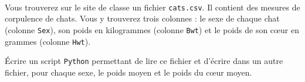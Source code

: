 \exer{[FIC-006]}
\setcounter{numques}{0}~\\

Vous trouverez sur le site de classe un fichier \texttt{cats.csv}.
Il contient des mesures de corpulence de chats. 
Vous y trouverez trois colonnes : le sexe de chaque chat (colonne \texttt{Sex}), son poids en kilogrammes (colonne \texttt{Bwt}) et le poids de son cœur en grammes (colonne \texttt{Hwt}). 

Écrire un script \texttt{Python}{} permettant de lire ce fichier et d'écrire dans un autre fichier, pour chaque sexe, le poids moyen et le poids du cœur moyen. 
